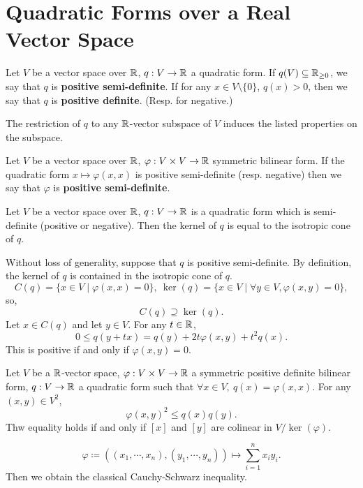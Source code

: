 \section{Quadratic Forms over a Real Vector Space}
\begin{definitionenv}
    Let $V$ be a vector space over $\mathbb{R}$, $q: V\rightarrow \mathbb{R}$ a quadratic form. If $q(V) \subseteq \mathbb{R}_{\ge 0}$, we say that $q$ is \textbf{positive semi-definite}. If for any $x\in V\setminus\{0\}$, $q(x)>0$, then we say that $q$ is \textbf{positive definite}. (Resp. for negative.)

    \quad The restriction of $q$ to any $\mathbb{R}$-vector subspace of $V$ induces the listed properties on the subspace.
\end{definitionenv}
\begin{definitionenv}
    Let $V$ be a vector space over $\mathbb{R}$, $\varphi: V\times V\rightarrow \mathbb{R}$ symmetric bilinear form.
    If the quadratic form $x\mapsto \varphi(x,x)$ is positive semi-definite (resp. negative) then we say that $\varphi$ is \textbf{positive semi-definite}.
\end{definitionenv}
\begin{lemmaenv}\label{2.4.3}
    Let $V$ be a vector space over $\mathbb{R}$, $q:V\rightarrow \mathbb{R}$ is a quadratic form which is semi-definite (positive or negative).
    Then the kernel of $q$ is equal to the isotropic cone of $q$.
\end{lemmaenv}
\begin{proofenv}
    Without loss of generality, suppose that $q$ is positive semi-definite. By definition, the kernel of $q$ is contained in the isotropic cone of $q$.
    $$ C(q) = \{ x\in V\mid \varphi(x,x) = 0 \},\ \ker(q) = \{x\in V\mid \forall y\in V, \varphi(x,y) = 0\},$$
    so,
    $$ C(q) \supseteq \ker(q).$$
    Let $x\in C(q)$ and let $y\in V$. For any $t\in\mathbb{R}$,
    $$ 0\le q(y+ tx)  = q (y) + 2t\varphi(x,y) + t^2 q(x).$$
    This is positive if and only if $\varphi(x,y) = 0.$
\end{proofenv}
\begin{theoremenv}
    Let $V$ be a $\mathbb{R}$-vector space, $\varphi:V\times V\rightarrow \mathbb{R}$ a symmetric positive definite bilinear form, $q : V\rightarrow \mathbb{R}$ a quadratic form such that $\forall x\in V,\ q(x) = \varphi(x,x).$
    For any $(x,y)\in V^2$,
    $$ \varphi(x,y)^2 \le q(x)q(y).$$
    Thw equality holds if and only if $[x]$ and $[y]$ are colinear in $V/\ker(\varphi)$.
\end{theoremenv}
\begin{remark}
    $$\varphi \coloneq \left((x_1,\cdots,x_n),(y_1,\cdots,y_n)\right)\mapsto \sum_{i=1}^{n}x_iy_i.$$
    Then we obtain the classical Cauchy-Schwarz inequality.
\end{remark}
